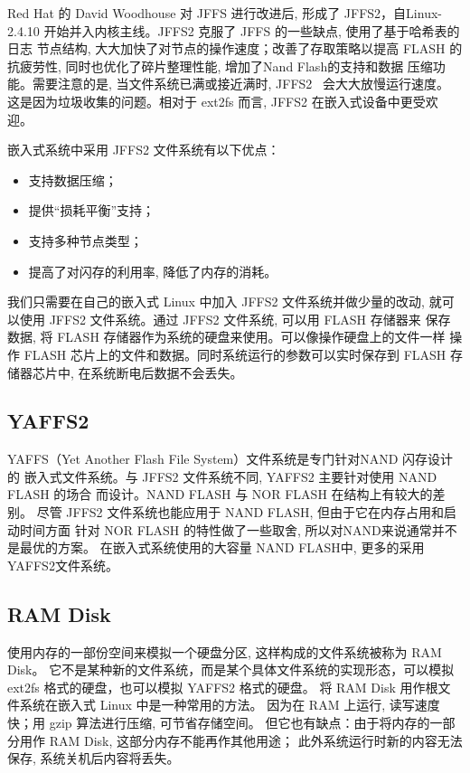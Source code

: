 Red Hat 的 David Woodhouse 对 JFFS 进行改进后, 形成了 JFFS2，自Linux-2.4.10
开始并入内核主线。JFFS2 克服了 JFFS 的一些缺点, 使用了基于哈希表的日志
节点结构, 大大加快了对节点的操作速度；改善了存取策略以提高 FLASH 的
抗疲劳性, 同时也优化了碎片整理性能, 增加了Nand Flash的支持和数据
压缩功能。需要注意的是, 当文件系统已满或接近满时, JFFS2~ 会大大放慢运行速度。
这是因为垃圾收集的问题。相对于 ext2fs 而言, JFFS2 在嵌入式设备中更受欢迎。

    嵌入式系统中采用 JFFS2 文件系统有以下优点：
\begin{itemize}
  \item 支持数据压缩；
  \item 提供``损耗平衡''支持；
  \item 支持多种节点类型；
  \item 提高了对闪存的利用率, 降低了内存的消耗。
\end{itemize}

我们只需要在自己的嵌入式 Linux 中加入 JFFS2 文件系统并做少量的改动, 
就可以使用 JFFS2 文件系统。通过 JFFS2 文件系统, 可以用 FLASH 存储器来
保存数据, 将 FLASH 存储器作为系统的硬盘来使用。可以像操作硬盘上的文件一样
操作 FLASH 芯片上的文件和数据。同时系统运行的参数可以实时保存到 FLASH
存储器芯片中, 在系统断电后数据不会丢失。

\subsection{YAFFS2}
YAFFS（Yet Another Flash File System）文件系统是专门针对NAND 闪存设计的
嵌入式文件系统。与 JFFS2 文件系统不同, YAFFS2 主要针对使用 NAND FLASH 的场合
而设计。NAND FLASH 与 NOR FLASH 在结构上有较大的差别。
尽管 JFFS2 文件系统也能应用于 NAND FLASH, 但由于它在内存占用和启动时间方面
针对 NOR FLASH 的特性做了一些取舍, 所以对NAND来说通常并不是最优的方案。
在嵌入式系统使用的大容量 NAND FLASH中, 更多的采用YAFFS2文件系统。

\subsection{RAM Disk}
使用内存的一部份空间来模拟一个硬盘分区, 这样构成的文件系统被称为 RAM Disk。
它不是某种新的文件系统，而是某个具体文件系统的实现形态，可以模拟 ext2fs
格式的硬盘，也可以模拟 YAFFS2 格式的硬盘。
将 RAM Disk 用作根文件系统在嵌入式 Linux 中是一种常用的方法。
因为在 RAM 上运行, 读写速度快；用 gzip 算法进行压缩, 可节省存储空间。
但它也有缺点：由于将内存的一部分用作 RAM Disk, 这部分内存不能再作其他用途；
此外系统运行时新的内容无法保存, 系统关机后内容将丢失。

